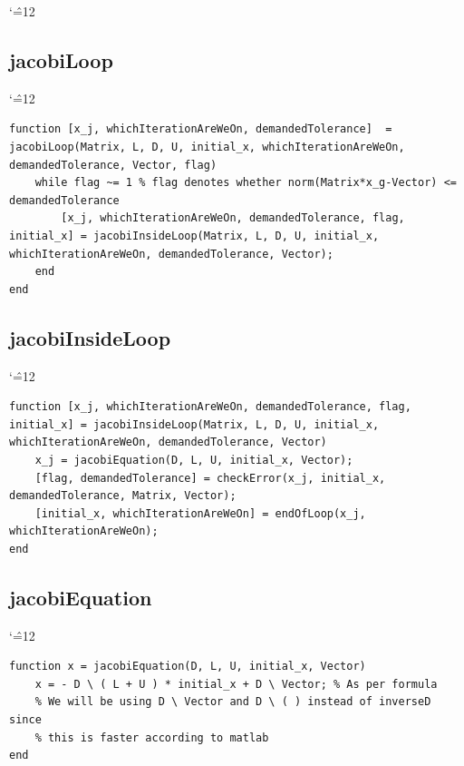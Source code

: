 \documentclass[12pt]{report}
\newenvironment{simplechar}{%
   \catcode`\^=12
}{}
\begin{document}
\begin{simplechar}
\newpage
\subsection{jacobiLoop}
\begin{simplechar}
\begin{lstlisting}
function [x_j, whichIterationAreWeOn, demandedTolerance]  = jacobiLoop(Matrix, L, D, U, initial_x, whichIterationAreWeOn, demandedTolerance, Vector, flag)
    while flag ~= 1 % flag denotes whether norm(Matrix*x_g-Vector) <= demandedTolerance
        [x_j, whichIterationAreWeOn, demandedTolerance, flag, initial_x] = jacobiInsideLoop(Matrix, L, D, U, initial_x, whichIterationAreWeOn, demandedTolerance, Vector);
    end
end
\end{lstlisting}
\end{simplechar}

\subsection{jacobiInsideLoop}
\begin{simplechar}
\begin{lstlisting}
function [x_j, whichIterationAreWeOn, demandedTolerance, flag, initial_x] = jacobiInsideLoop(Matrix, L, D, U, initial_x, whichIterationAreWeOn, demandedTolerance, Vector)
    x_j = jacobiEquation(D, L, U, initial_x, Vector);
    [flag, demandedTolerance] = checkError(x_j, initial_x, demandedTolerance, Matrix, Vector);
    [initial_x, whichIterationAreWeOn] = endOfLoop(x_j, whichIterationAreWeOn);
end
\end{lstlisting}
\end{simplechar}

\subsection{jacobiEquation}
\begin{simplechar}
\begin{lstlisting}
function x = jacobiEquation(D, L, U, initial_x, Vector)
    x = - D \ ( L + U ) * initial_x + D \ Vector; % As per formula
    % We will be using D \ Vector and D \ ( ) instead of inverseD since
    % this is faster according to matlab
end
\end{lstlisting}
\end{simplechar}


\end{simplechar}
\end{document}

